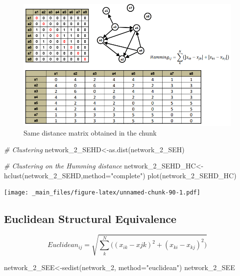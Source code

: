 \documentclass[
  notitlepage,
  onecolumn,
  openany]{book}
\newenvironment{Shaded}{\begin{snugshade}}{\end{snugshade}}
\newcommand{\AttributeTok}[1]{\textcolor[rgb]{0.77,0.63,0.00}{#1}}
\newcommand{\CommentTok}[1]{\textcolor[rgb]{0.56,0.35,0.01}{\textit{#1}}}
\newcommand{\FunctionTok}[1]{\textcolor[rgb]{0.00,0.00,0.00}{#1}}
\newcommand{\NormalTok}[1]{#1}
\newcommand{\OtherTok}[1]{\textcolor[rgb]{0.56,0.35,0.01}{#1}}
\newcommand{\StringTok}[1]{\textcolor[rgb]{0.31,0.60,0.02}{#1}}
\begin{document}
\begin{figure}[h!]

{\centering \includegraphics[width=0.5\linewidth]{images/11-Subgroups and Structural Equivalence/Untitled 7} 

}

\caption{Same distance matrix obtained in the chunk}\label{fig:unnamed-chunk-89}
\end{figure}

\begin{Shaded}
\begin{Highlighting}[]
\CommentTok{\# Clustering}
\NormalTok{network\_2\_SEHD}\OtherTok{\textless{}{-}}\FunctionTok{as.dist}\NormalTok{(network\_2\_SEH)}

\CommentTok{\# Clustering on the Humming distance}
\NormalTok{network\_2\_SEHD\_HC}\OtherTok{\textless{}{-}}\FunctionTok{hclust}\NormalTok{(network\_2\_SEHD,}\AttributeTok{method=}\StringTok{"complete"}\NormalTok{)}
\FunctionTok{plot}\NormalTok{(network\_2\_SEHD\_HC)}
\end{Highlighting}
\end{Shaded}

\texttt{[image: \_main\_files/figure-latex/unnamed-chunk-90-1.pdf]}

\hypertarget{euclidean-structural-equivalence}{%
\subsection{Euclidean Structural Equivalence}\label{euclidean-structural-equivalence}}

\[
Euclidean_{ij} = \sqrt{\sum_k^N \Big((x_{ik}-x{jk})^2+(x_{ki}-x_{kj})^2\Big)}
\]

\begin{Shaded}
\begin{Highlighting}[]
\NormalTok{network\_2\_SEE}\OtherTok{\textless{}{-}}\FunctionTok{sedist}\NormalTok{(network\_2, }\AttributeTok{method=}\StringTok{"euclidean"}\NormalTok{)}
\NormalTok{network\_2\_SEE}
\end{Highlighting}
\end{Shaded}
\end{document}
